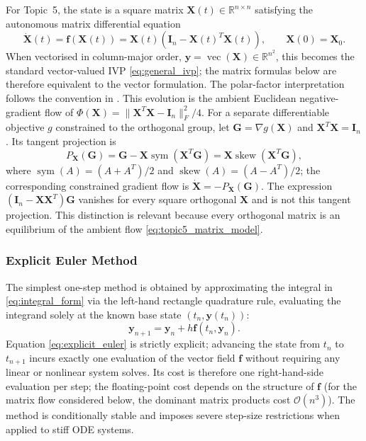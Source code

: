 For Topic~5, the state is a square matrix
$\mathbf{X}(t)\in\mathbb{R}^{n\times n}$ satisfying the autonomous
matrix differential equation
\begin{equation}
\label{eq:topic5_matrix_model}
\dot{\mathbf{X}}(t)
=
\mathbf{f}(\mathbf{X}(t))
=
\mathbf{X}(t)\left(\mathbf{I}_n-\mathbf{X}(t)^T\mathbf{X}(t)\right),
\qquad
\mathbf{X}(0)=\mathbf{X}_0.
\end{equation}
When vectorised in column-major order,
$\mathbf{y}=\operatorname{vec}(\mathbf{X})\in\mathbb{R}^{n^2}$,
this becomes the standard vector-valued IVP \eqref{eq:general_ivp}; the
matrix formulas below are therefore equivalent to the vector formulation.
The polar-factor interpretation follows the convention in \cite{higham1986}. This evolution is the ambient Euclidean negative-gradient flow of
$\Phi(\mathbf X)=\|\mathbf X^T\mathbf X-\mathbf I_n\|_F^2/4$.
For a separate differentiable objective $g$ constrained to the
orthogonal group, let $\mathbf G=\nabla g(\mathbf X)$ and
$\mathbf X^T\mathbf X=\mathbf I_n$. Its tangent projection is
\begin{equation}
\label{eq:orthogonal_tangent_projection}
P_{\mathbf X}(\mathbf G)
=\mathbf G-\mathbf X\operatorname{sym}(\mathbf X^T\mathbf G)
=\mathbf X\operatorname{skew}(\mathbf X^T\mathbf G),
\end{equation}
where $\operatorname{sym}(A)=(A+A^T)/2$ and
$\operatorname{skew}(A)=(A-A^T)/2$; the corresponding constrained
gradient flow is $\dot{\mathbf X}=-P_{\mathbf X}(\mathbf G)$.
The expression $(\mathbf I_n-\mathbf X\mathbf X^T)\mathbf G$ vanishes
for every square orthogonal $\mathbf X$ and is not this tangent
projection. This distinction is relevant because every orthogonal
matrix is an equilibrium of the ambient flow \eqref{eq:topic5_matrix_model}.

\subsubsection{Explicit Euler Method}
The simplest one-step method is obtained by approximating the integral in \eqref{eq:integral_form} via the left-hand rectangle quadrature rule, evaluating the integrand solely at the known base state $(t_n, \mathbf{y}(t_n))$:
\begin{equation}
\label{eq:explicit_euler}
\mathbf{y}_{n+1} = \mathbf{y}_n + h \mathbf{f}(t_n, \mathbf{y}_n).
\end{equation}
Equation \eqref{eq:explicit_euler} is strictly explicit; advancing the state from $t_n$ to $t_{n+1}$ incurs exactly one evaluation of the vector field $\mathbf{f}$ without requiring any linear or nonlinear system solves. Its cost is therefore one right-hand-side evaluation per step; the floating-point cost depends on the structure of $\mathbf{f}$ (for the matrix flow considered below, the dominant matrix products cost $\mathcal{O}(n^3)$). The method is conditionally stable and imposes severe step-size restrictions when applied to stiff ODE systems.

